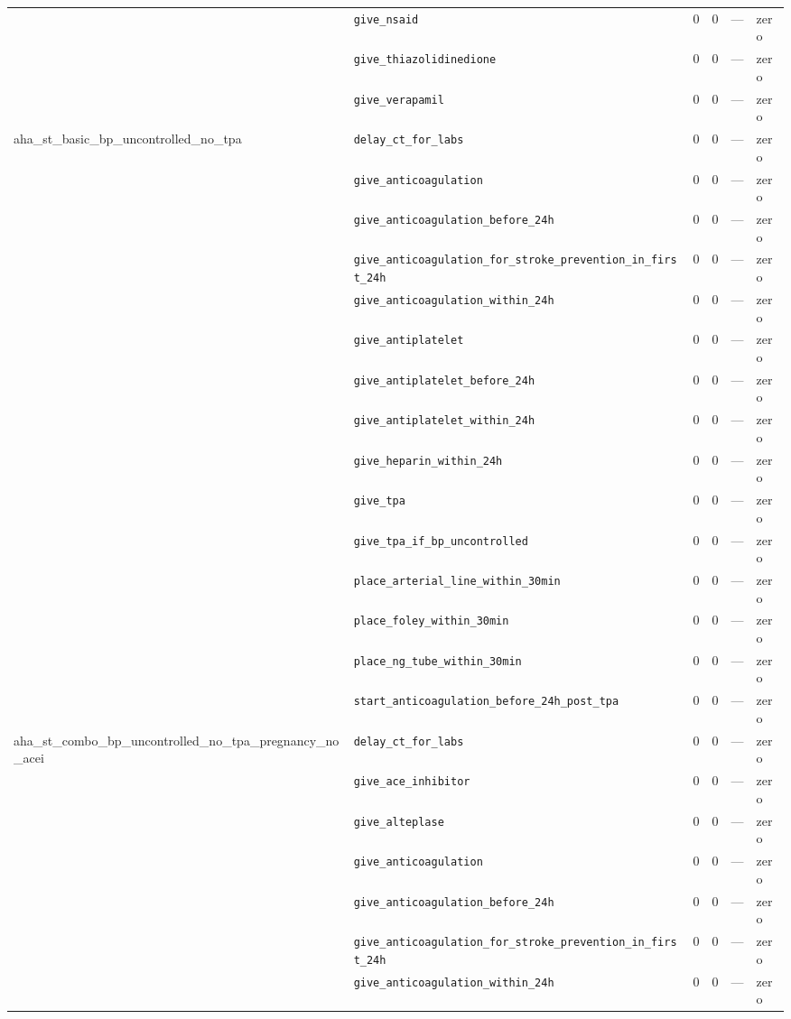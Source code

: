 \begin{table}[ht]
\begin{tabular}{llrrrl}
 & \texttt{give\_nsaid} & 0 & 0 & — & zero \\
 & \texttt{give\_thiazolidinedione} & 0 & 0 & — & zero \\
 & \texttt{give\_verapamil} & 0 & 0 & — & zero \\
\midrule
aha\_st\_basic\_bp\_uncontrolled\_no\_tpa & \texttt{delay\_ct\_for\_labs} & 0 & 0 & — & zero \\
 & \texttt{give\_anticoagulation} & 0 & 0 & — & zero \\
 & \texttt{give\_anticoagulation\_before\_24h} & 0 & 0 & — & zero \\
 & \texttt{give\_anticoagulation\_for\_stroke\_prevention\_in\_first\_24h} & 0 & 0 & — & zero \\
 & \texttt{give\_anticoagulation\_within\_24h} & 0 & 0 & — & zero \\
 & \texttt{give\_antiplatelet} & 0 & 0 & — & zero \\
 & \texttt{give\_antiplatelet\_before\_24h} & 0 & 0 & — & zero \\
 & \texttt{give\_antiplatelet\_within\_24h} & 0 & 0 & — & zero \\
 & \texttt{give\_heparin\_within\_24h} & 0 & 0 & — & zero \\
 & \texttt{give\_tpa} & 0 & 0 & — & zero \\
 & \texttt{give\_tpa\_if\_bp\_uncontrolled} & 0 & 0 & — & zero \\
 & \texttt{place\_arterial\_line\_within\_30min} & 0 & 0 & — & zero \\
 & \texttt{place\_foley\_within\_30min} & 0 & 0 & — & zero \\
 & \texttt{place\_ng\_tube\_within\_30min} & 0 & 0 & — & zero \\
 & \texttt{start\_anticoagulation\_before\_24h\_post\_tpa} & 0 & 0 & — & zero \\
\midrule
aha\_st\_combo\_bp\_uncontrolled\_no\_tpa\_pregnancy\_no\_acei & \texttt{delay\_ct\_for\_labs} & 0 & 0 & — & zero \\
 & \texttt{give\_ace\_inhibitor} & 0 & 0 & — & zero \\
 & \texttt{give\_alteplase} & 0 & 0 & — & zero \\
 & \texttt{give\_anticoagulation} & 0 & 0 & — & zero \\
 & \texttt{give\_anticoagulation\_before\_24h} & 0 & 0 & — & zero \\
 & \texttt{give\_anticoagulation\_for\_stroke\_prevention\_in\_first\_24h} & 0 & 0 & — & zero \\
 & \texttt{give\_anticoagulation\_within\_24h} & 0 & 0 & — & zero \\

\end{tabular}
\end{table}
